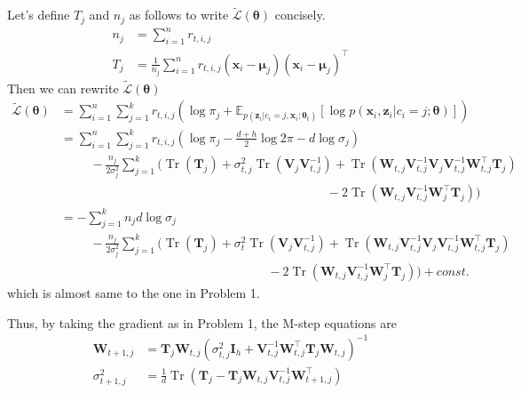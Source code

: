 \documentclass[11pt]{article}
\DeclareMathOperator{\tr}{Tr}
\begin{document}
\begin{enumerate}
\begin{enumerate}
    Let's define $T_j$ and $n_j$ as follows to write $\tilde{\mathcal{L}}(\bm\theta)$ concisely.
    \begin{align*}
    n_j &= \sum_{i=1}^{n}r_{t,i,j} \\
    T_j &= \frac{1}{n_j}\sum_{i=1}^{n}r_{t,i,j}(\bm x_i-\bm\mu_j)(\bm x_i-\bm\mu_j)^{\top}
    \end{align*}
    Then we can rewrite $\tilde{\mathcal{L}}(\bm\theta)$
    \begin{align*}
    \tilde{\mathcal{L}}(\bm\theta)
    &= \sum_{i=1}^{n}\sum_{j=1}^{k}r_{t,i,j}\left(\log\pi_j+\mathbb{E}_{p(\bm z_i|c_i=j,\bm x_i;\bm\theta_t)}[\log p(\bm x_i,\bm z_i|c_i=j;\bm\theta)]\right) \\
    &= \sum_{i=1}^{n}\sum_{j=1}^{k}r_{t,i,j}\left(\log\pi_j-\frac{d+h}{2}\log 2\pi-d\log\sigma_j\right) \\
    &\hspace{1cm} -\frac{n_j}{2\sigma_j^2}\sum_{j=1}^{k}\bigg(\tr(\bm T_j)+\sigma_{t,j}^2\tr\left(\bm V_j\bm V_{t,j}^{-1}\right)+\tr\left(\bm W_{t,j}\bm V_{t,j}^{-1}\bm V_j\bm V_{t,j}^{-1}\bm W_{t,j}^{\top}\bm T_j\right) \\
    &\hspace{9cm} -2\tr\left(\bm W_{t,j}\bm V_{t,j}^{-1}\bm W_{j}^{\top}\bm T_j\right)\bigg) \\
    &= -\sum_{j=1}^{k}n_jd\log\sigma_j \\
    &\hspace{1cm} -\frac{n_j}{2\sigma_j^2}\sum_{j=1}^{k}\bigg(\tr(\bm T_j)+\sigma_t^2\tr\left(\bm V_j\bm V_{t,j}^{-1}\right)+\tr\left(\bm W_{t,j}\bm V_{t,j}^{-1}\bm V_j\bm V_{t,j}^{-1}\bm W_{t,j}^{\top}\bm T_j\right) \\
    &\hspace{7cm} -2\tr\left(\bm W_{t,j}\bm V_{t,j}^{-1}\bm W_{j}^{\top}\bm T_j\right)\bigg)+const.
    \end{align*}
    which is almost same to the one in Problem 1.
    
    Thus, by taking the gradient as in Problem 1, the M-step equations are
    \begin{align*}
    \bm W_{t+1,j} &= \bm T_j\bm W_{t,j}\left(\sigma_{t,j}^2\bm I_h+\bm V_{t,j}^{-1}\bm W_{t,j}^{\top}\bm T_j\bm W_{t,j}\right)^{-1} \\
    \sigma_{t+1,j}^2 &= \frac{1}{d}\tr\left(\bm T_j-\bm T_j\bm W_{t,j}\bm V_{t,j}^{-1}\bm W_{t+1,j}^{\top}\right)
    \end{align*}
    \end{enumerate}
\end{enumerate}
\end{document}
